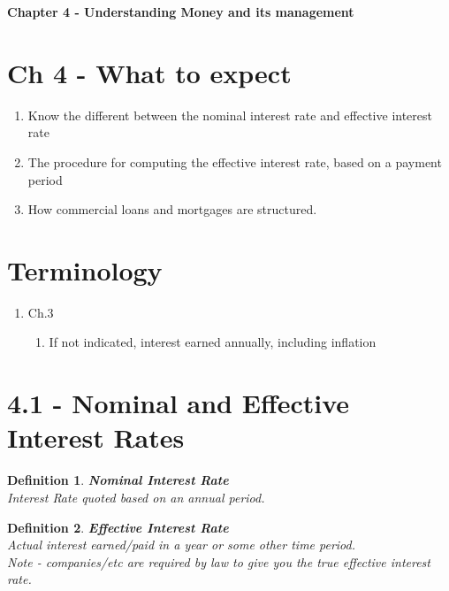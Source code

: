 \documentclass{report} %
\newtheorem{defn}{Definition}
\begin{document}
\begin{center}
    \LARGE{\textbf{Chapter 4 - Understanding Money and its management}}
\end{center}
\section*{Ch 4 - What to expect}
\begin{enumerate}
    \item Know the different between the nominal interest rate and effective interest rate
    \item The procedure for computing the effective interest rate, based on a payment period
    \item How commercial loans and mortgages are structured.
\end{enumerate}

\section*{Terminology}
\begin{enumerate}
    \item Ch.3
    \begin{enumerate}
        \item If not indicated, interest earned annually, including inflation
    \end{enumerate}
\end{enumerate}

\section*{4.1 - Nominal and Effective Interest Rates}
\begin{defn}
    \textbf{Nominal Interest Rate} \\
    Interest Rate quoted based on an annual period.
\end{defn}

\begin{defn}
    \textbf{Effective Interest Rate} \\
    Actual interest earned/paid in a year or some other time period. \\
    Note - companies/etc are required by law to give you the true effective interest rate.
\end{defn}
\end{document}

